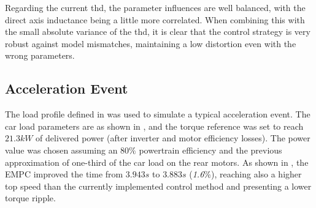 Regarding the current \gls{thd}, the parameter influences are well balanced, with the direct axis inductance being a little more correlated. When combining this with the small absolute variance of the \gls{thd}, it is clear that the control strategy is very robust against model mismatches, maintaining a low distortion even with the wrong parameters.

\subsection{Acceleration Event}
\label{section:acceleration}%

The load profile defined in  was used to simulate a typical acceleration event. The car load parameters are as shown in , and the torque reference was set to reach $21.3kW$ of delivered power (after inverter and motor efficiency losses). The power value was chosen assuming an $80\%$ powertrain efficiency and the previous approximation of one-third of the car load on the rear motors. As shown in , the EMPC improved the time from $3.943s$ to $3.883s$ (\textit{1.6}\%), reaching also a higher top speed than the currently implemented control method and presenting a lower torque ripple.

